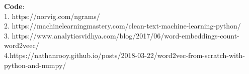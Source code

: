 \documentclass[12pt,a4paper]{report}
\begin{document}
\textbf{Code}: \\
1. https://norvig.com/ngrams/ \\
2. https://machinelearningmastery.com/clean-text-machine-learning-python/ \\
3. https://www.analyticsvidhya.com/blog/2017/06/word-embeddings-count-word2veec/ \\
4.https://nathanrooy.github.io/posts/2018-03-22/word2vec-from-scratch-with-python-and-numpy/ \\
\end{document}
